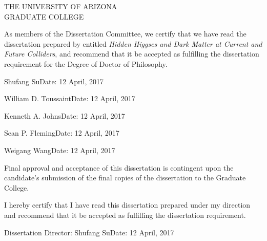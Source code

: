 \begin{center}
  {\scshape THE UNIVERSITY OF ARIZONA\\
  GRADUATE COLLEGE}
\end{center}
As members of the Dissertation Committee, we certify that we have read the dissertation prepared by {\@author} entitled \emph{Hidden Higgses and Dark Matter at Current and Future Colliders}, and recommend that it be accepted as fulfilling the dissertation requirement for the Degree of Doctor of Philosophy.
\vfill

\noindent \hrulefill

\smallskip

\noindent Shufang Su\hfill Date: 12 April, 2017
\bigskip\bigskip

\noindent \hrulefill
\smallskip

\noindent William D. Toussaint\hfill Date: 12 April, 2017
\bigskip\bigskip

\noindent \hrulefill
\smallskip

\noindent Kenneth A. Johns\hfill Date: 12 April, 2017
\bigskip\bigskip

\noindent \hrulefill

\smallskip

\noindent Sean P. Fleming\hfill Date: 12 April, 2017
\bigskip\bigskip

\noindent \hrulefill

\smallskip

\noindent Weigang Wang\hfill Date: 12 April, 2017
\vfill

\noindent Final approval and acceptance of this dissertation is contingent upon the candidate’s submission of the final copies of the dissertation to the Graduate College. 

\vfill
\noindent I hereby certify that I have read this dissertation prepared under my direction and recommend that it be accepted as fulfilling the dissertation requirement.

\bigskip\bigskip
\noindent\hrulefill
\smallskip

\noindent Dissertation Director: Shufang Su\hfill Date: 12 April, 2017

